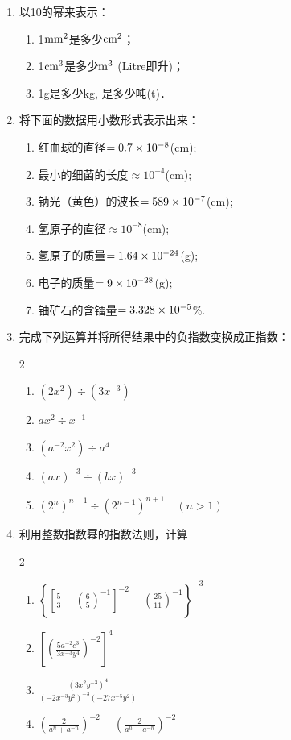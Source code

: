 \begin{enumerate}
\item 以10的幂来表示：
\begin{enumerate}
    \item 1${\rm mm}^2$是多少${\rm cm}^2$；
    \item 1${\rm cm}^3$是多少${\rm m}^3$ (Litre即升)；
    \item 1g是多少kg, 是多少吨(t)．
\end{enumerate}
\item 将下面的数据用小数形式表示出来：
\begin{enumerate}
    \item 红血球的直径$=0.7\times10^{-8}$(cm);
    \item 最小的细菌的长度$\approx 10^{-4}$(cm);
    \item 钠光（黄色）的波长$=589\times10^{-7}$(cm);
    \item 氢原子的直径$\approx 10^{-8}$(cm);
    \item 氢原子的质量$=1.64\times10^{-24}$(g);
    \item 电子的质量$=9\times10^{-28}$(g);
    \item 铀矿石的含镭量$=3.328\times10^{-5}$\%.
\end{enumerate}

\item 完成下列运算并将所得结果中的负指数变换成正指数：
\begin{multicols}{2}
 \begin{enumerate}
    \item $(2x^2)\div (3x^{-3})$
    \item $ax^2\div x^{-1}$
    \item $(a^{-2}x^2)\div a^4$
    \item $(ax)^{-3}\div (bx)^{-3}$
    \item $(2^n)^{n-1} \div (2^{n-1})^{n+1}\quad (n>1)$
\end{enumerate}   
\end{multicols}

\item 利用整数指数幂的指数法则，计算
\begin{multicols}{2}\begin{enumerate}  
\item $\left\{\left[\frac{5}{3}-\left(\frac{6}{5}\right)^{-1}\right]^{-2}-\left(\frac{25}{11}\right)^{-1}\right\}^{-3}$\item $\left[\left(\frac{5 a^{-2} c^{3}}{3 x^{-3} y^{4}}\right)^{-2}\right]^{4}$
\item $\frac{\left(3 x^{2} y^{-3}\right)^4}{\left(-2 x^{-3} y^{2}\right)^{-3}\left(-27 x^{-5} y^{2}\right)}$
\item $\left(\frac{2}{a^{n}+a^{-n}}\right)^{-2}-\left(\frac{2}{a^{n}-a^{-n}}\right)^{-2}$
\end{enumerate}\end{multicols}


\end{enumerate}
